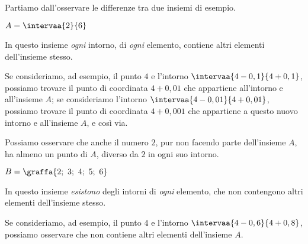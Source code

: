 Partiamo dall'osservare le differenze tra due insiemi di esempio.

\begin{esempio}
\item \(A = \intervaa{2}{6}\) 

In questo insieme \emph{ogni} intorno, di \emph{ogni} elemento, 
contiene altri elementi dell'insieme stesso.

Se consideriamo, ad esempio, il punto \(4\) e l'intorno 
\(\intervaa{4-0,1}{4+0,1}\), possiamo trovare il punto di coordinata 
\(4+0,01\) che appartiene all'intorno e all'insieme \(A\);
se consideriamo l'intorno 
\(\intervaa{4-0,01}{4+0,01}\), possiamo trovare il punto di coordinata 
\(4+0,001\) che appartiene a questo nuovo intorno e all'insieme \(A\), 
e così via.

Possiamo osservare che anche il numero \(2\), pur non facendo 
parte dell'insieme \(A\), ha almeno un punto di \(A\), diverso da \(2\) in 
ogni suo intorno.
\end{esempio}

\begin{esempio}
\item \(B=\graffa{2;~3;~4;~5;~6}\) 

In questo insieme \emph{esistono} degli intorni di \emph{ogni} elemento,
che non contengono altri elementi dell'insieme stesso.

Se consideriamo, ad esempio, il punto \(4\) e l'intorno 
\(\intervaa{4-0,6}{4+0,8}\), possiamo osservare che non contiene 
altri elementi dell'insieme \(A\).
\end{esempio}


